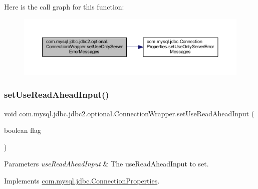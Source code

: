 Here is the call graph for this function\+:
\nopagebreak
\begin{figure}[H]
\begin{center}
\leavevmode
\includegraphics[width=350pt]{classcom_1_1mysql_1_1jdbc_1_1jdbc2_1_1optional_1_1_connection_wrapper_aeb0a18bb97912baf34e436f5a61e7233_cgraph}
\end{center}
\end{figure}
\mbox{\label{classcom_1_1mysql_1_1jdbc_1_1jdbc2_1_1optional_1_1_connection_wrapper_ae880ea3eac682792cff918e06fddbb3b}} 
\subsubsection{\texorpdfstring{set\+Use\+Read\+Ahead\+Input()}{setUseReadAheadInput()}}
{\footnotesize\ttfamily void com.\+mysql.\+jdbc.\+jdbc2.\+optional.\+Connection\+Wrapper.\+set\+Use\+Read\+Ahead\+Input (\begin{DoxyParamCaption}\item[{boolean}]{flag }\end{DoxyParamCaption})}


\begin{DoxyParams}{Parameters}
{\em use\+Read\+Ahead\+Input} & The use\+Read\+Ahead\+Input to set. \\
\hline
\end{DoxyParams}


Implements \mbox{\hyperlink{interfacecom_1_1mysql_1_1jdbc_1_1_connection_properties_a4c83918a441a7c5938d0ec80a975b92b}{com.\+mysql.\+jdbc.\+Connection\+Properties}}.

